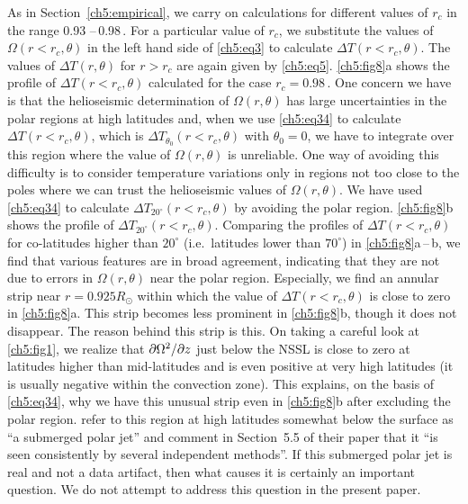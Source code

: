  
 


As in Section~\ref{ch5:empirical}, we carry on calculations for different values of $r_c$ in the range 0.93\,\Rsun\,--\,0.98\,\Rsun. For a particular value of $r_c$, we substitute the values of $\Omega (r < r_c,\theta)$ in the left hand side of \autoref{ch5:eq3} to calculate $\Delta T (r < r_c,\theta)$. The values of $\Delta T (r,\theta)$ for $r > r_c$ are again given by \autoref{ch5:eq5}.  \autoref{ch5:fig8}a shows the profile of $\Delta T(r<r_c,\theta)$ calculated for the case $r_c = 0.98$\,\Rsun. One concern we have is that the helioseismic determination of
$\Omega (r, \theta)$ has large uncertainties in the polar regions
at high latitudes and, when we use \autoref{ch5:eq34} to calculate $\Delta T (r < r_c,\theta)$, which is $\Delta T_{\theta_0} (r < r_c,\theta)$ with
$\theta_0 = 0$, we have to integrate over this region where the
value of $\Omega (r, \theta)$ is unreliable. One way of avoiding
this difficulty is to consider temperature variations only in 
regions not too close to the poles where we can trust the helioseismic
values of $\Omega(r, \theta)$. We have used \autoref{ch5:eq34} to calculate
$\Delta T_{20^{\circ}} (r < r_c,\theta)$ by avoiding the polar
region. \autoref{ch5:fig8}b shows the profile of
$\Delta T_{20^{\circ}} (r < r_c,\theta)$. Comparing the profiles
of $\Delta T (r < r_c,\theta)$ for co-latitudes higher than $20^{\circ}$ (i.e.\ latitudes lower than $70^{\circ}$)
in  \autoref{ch5:fig8}a\,--\,b, we find that various
features are in broad agreement, indicating that they are not due
to errors in $\Omega (r, \theta)$ near the polar region. 
Especially, we find an annular strip near $r = 0.925 R_{\odot}$ within which the value of $\Delta T (r < r_c,\theta)$ is close to zero in  \autoref{ch5:fig8}a.  This strip becomes
less prominent in  \autoref{ch5:fig8}b,
though it does not disappear. The reason behind this strip
is this.  On taking a careful look at \autoref{ch5:fig1}, we realize
that $\partial \Omega^2/\partial z$ just below the NSSL is close
to zero at latitudes higher than mid-latitudes and is
even positive at very high latitudes (it is usually negative within the convection zone). This explains, on
the basis of \autoref{ch5:eq34}, why we have this unusual strip even in
 \autoref{ch5:fig8}b after excluding the
polar region. \citet{Schou1998} refer to this region
at high latitudes somewhat below the surface
as ``a submerged polar jet'' and comment in Section~5.5 of
their paper that it ``is seen consistently by several independent methods''.  If this submerged polar jet is
real and not a data artifact, then what causes it is certainly an important
question.  We do not attempt to address this question in
the present paper.

